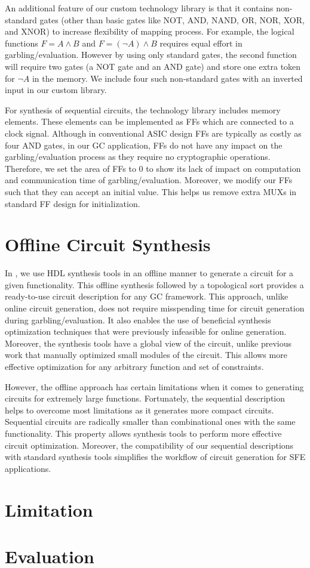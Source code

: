 An additional feature of our custom technology library is that it contains non-standard gates (other than basic gates like NOT, AND, NAND, OR, NOR, XOR, and XNOR) to increase flexibility of mapping process.
For example, the logical functions $F = A\wedge B$ and $F = (\neg A)\wedge B$ requires equal effort in garbling/evaluation.
However by using only standard gates, the second function will require two gates (a NOT gate and an AND gate) and store one extra token for $\neg A$ in the memory.
We include four such non-standard gates with an inverted input in our custom library.

For synthesis of sequential circuits, the technology library includes memory elements.
These elements can be implemented as FFs which are connected to a clock signal.
Although in conventional ASIC design FFs are typically as costly as four AND gates, in our GC application, FFs do not have any impact on the garbling/evaluation process as they require no cryptographic operations.
Therefore, we set the area of FFs to 0 to show its lack of impact on computation and communication time of garbling/evaluation.
Moreover, we modify our FFs such that they can accept an initial value.
This helps us remove extra MUXs in standard FF design for initialization.

\section{Offline Circuit Synthesis}
In \sys{}, we use HDL synthesis tools in an offline manner to generate a circuit for a given functionality.
This offline synthesis followed by a topological sort provides a ready-to-use circuit description for any GC framework.
This approach, unlike online circuit generation, does not require misspending time for circuit generation during garbling/evaluation.
It also enables the use of beneficial synthesis optimization techniques that were previously infeasible for online generation.
Moreover, the synthesis tools have a global view of the circuit, unlike previous work that manually optimized small modules of the circuit.
This allows more effective optimization for any arbitrary function and set of constraints.

However, the offline approach has certain limitations when it comes to generating circuits for extremely large functions.
Fortunately, the sequential description helps to overcome most limitations as it generates more compact circuits.
Sequential circuits are radically smaller than combinational ones with the same functionality.
This property allows synthesis tools to perform more effective circuit optimization.
Moreover, the compatibility of our sequential descriptions with standard synthesis tools simplifies the workflow of circuit generation for SFE applications.

\section{Limitation}


\section{Evaluation}
